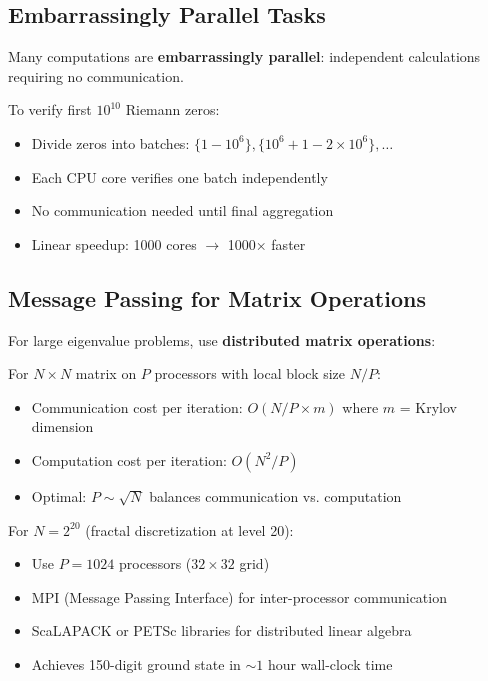 \subsection{Embarrassingly Parallel Tasks}

Many computations are \textbf{embarrassingly parallel}: independent calculations requiring no communication.

\begin{example}
To verify first $10^{10}$ Riemann zeros:
\begin{itemize}
\item Divide zeros into batches: $\{1-10^6\}, \{10^6+1-2\times 10^6\}, \ldots$
\item Each CPU core verifies one batch independently
\item No communication needed until final aggregation
\item Linear speedup: 1000 cores $\rightarrow$ 1000× faster
\end{itemize}
\end{example}

\subsection{Message Passing for Matrix Operations}

For large eigenvalue problems, use \textbf{distributed matrix operations}:

\begin{thm}\label{thm:distributed-arnoldi}
For $N \times N$ matrix on $P$ processors with local block size $N/P$:
\begin{itemize}
\item Communication cost per iteration: $O(N/P \times m)$ where $m$ = Krylov dimension
\item Computation cost per iteration: $O(N^2/P)$
\item Optimal: $P \sim \sqrt{N}$ balances communication vs. computation
\end{itemize}
\end{thm}

\begin{remark}
For $N = 2^{20}$ (fractal discretization at level 20):
\begin{itemize}
\item Use $P = 1024$ processors ($32 \times 32$ grid)
\item MPI (Message Passing Interface) for inter-processor communication
\item ScaLAPACK or PETSc libraries for distributed linear algebra
\item Achieves 150-digit ground state in $\sim 1$ hour wall-clock time
\end{itemize}
\end{remark}

